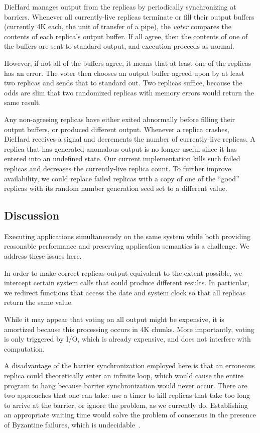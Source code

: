 \documentclass{sig-alternate}
\begin{document}
\noindent
DieHard manages output from the replicas by periodically synchronizing
at barriers. Whenever all currently-live replicas terminate or fill
their output buffers (currently 4K each, the unit of transfer of a
pipe), the \emph{voter} compares the contents of each replica's output
buffer. If all agree, then the contents of one of the buffers are sent
to standard output, and execution proceeds as normal.

However, if not all of the buffers agree, it means that at least one
of the replicas has an error. The voter then chooses an output buffer
agreed upon by at least two replicas and sends that to standard out.
Two replicas suffice, because the odds are slim that two randomized
replicas with memory errors would return the same result.

Any non-agreeing replicas have either exited abnormally before filling
their output buffers, or produced different output. Whenever a replica
crashes, DieHard receives a signal and decrements the number of
currently-live replicas. A replica that has generated anomalous output
is no longer useful since it has entered into an undefined state. Our
current implementation kills such failed replicas and decreases the
currently-live replica count. To further improve availability, we
could replace failed replicas with a copy of one of the ``good''
replicas with its random number generation seed set to a different
value.

\subsection{Discussion}

\noindent
Executing applications simultaneously on the same system while
both providing reasonable performance and preserving application
semantics is a challenge. We address these issues here.

In order to make correct replicas output-equivalent to the
extent possible, we intercept certain system calls that could produce
different results. In particular, we redirect functions that access
the date and system clock so that all replicas return the same value.

While it may appear that voting on all output might be expensive, it
is amortized because this processing occurs in 4K chunks. More
importantly, voting is only triggered by I/O, which is already
expensive, and does not interfere with computation.

A disadvantage of the barrier synchronization employed here is that an
erroneous replica could theoretically enter an infinite loop, which
would cause the entire program to hang because barrier synchronization
would never occur. There are two approaches that one can take: use a
timer to kill replicas that take too long to arrive at the barrier, or
ignore the problem, as we currently do. Establishing an appropriate
waiting time would solve the problem of consensus in the presence of
Byzantine failures, which is undecidable~\cite{214121}.
\end{document}

